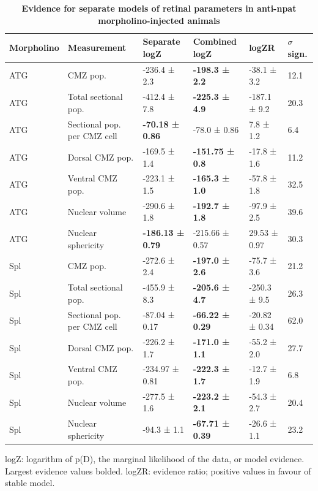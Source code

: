 \documentclass{ut-thesis}
\begin{document}
\begin{NoHyper}
\begin{table}[!ht]
    \caption{{\bf Evidence for separate models of retinal parameters in anti-npat morpholino-injected animals}}
    \begin{tabular}{|l|l|l|l|l|l|} 
        \hline
        {\bf Morpholino} & {\bf Measurement} & {\bf Separate logZ} & {\bf Combined logZ} & {\bf logZR} & {\bf $\sigma$ sign.}\\ \hline \hline
        ATG & CMZ pop. & -236.4 ± 2.3 & {\bf -198.3 ± 2.2} & -38.1 ± 3.2 & 12.1 \\ \hline
        ATG & Total sectional pop. & -412.4 ± 7.8 & {\bf -225.3 ± 4.9} & -187.1 ± 9.2 & 20.3 \\ \hline
        ATG & Sectional pop. per CMZ cell & {\bf -70.18 ± 0.86} & -78.0 ± 0.86 & 7.8 ± 1.2 & 6.4 \\ \hline
        ATG & Dorsal CMZ pop. & -169.5 ± 1.4 & {\bf -151.75 ± 0.8} & -17.8 ± 1.6 & 11.2 \\ \hline
        ATG & Ventral CMZ pop. & -223.1 ± 1.5 & {\bf -165.3 ± 1.0} & -57.8 ± 1.8 & 32.5 \\ \hline
        ATG & Nuclear volume & -290.6 ± 1.8 & {\bf -192.7 ± 1.8} & -97.9 ± 2.5 & 39.6 \\ \hline
        ATG & Nuclear sphericity & {\bf -186.13 ± 0.79} & -215.66 ± 0.57 & 29.53 ± 0.97 & 30.3 \\ \hline
        Spl & CMZ pop. & -272.6 ± 2.4 & {\bf -197.0 ± 2.6} & -75.7 ± 3.6 & 21.2 \\ \hline
        Spl & Total sectional pop. & -455.9 ± 8.3 & {\bf -205.6 ± 4.7} & -250.3 ± 9.5 & 26.3 \\ \hline
        Spl & Sectional pop. per CMZ cell & -87.04 ± 0.17 & {\bf -66.22 ± 0.29} & -20.82 ± 0.34 & 62.0 \\ \hline
        Spl & Dorsal CMZ pop. & -226.2 ± 1.7 & {\bf -171.0 ± 1.1} & -55.2 ± 2.0 & 27.7 \\ \hline
        Spl & Ventral CMZ pop. & -234.97 ± 0.81 & {\bf -222.3 ± 1.7} & -12.7 ± 1.9 & 6.8 \\ \hline
        Spl & Nuclear volume & -277.5 ± 1.6 & {\bf -223.2 ± 2.1} & -54.3 ± 2.7 & 20.4 \\ \hline
        Spl & Nuclear sphericity & -94.3 ± 1.1 & {\bf -67.71 ± 0.39} & -26.6 ± 1.1 & 23.2 \\ \hline
    \end{tabular}

    \begin{flushleft}logZ: logarithm of p(D), the marginal likelihood of the data, or model evidence.  Largest evidence values bolded. logZR: evidence ratio; positive values in favour of stable model.
    \end{flushleft}
    \label{morpholinoev}
\end{table}


\end{NoHyper}
\end{document}
